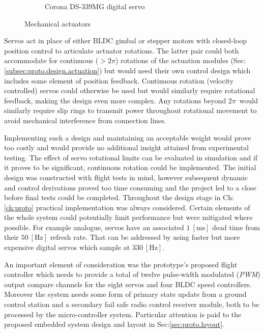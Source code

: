 \begin{figure}[hbtp]
\begin{subfigure}{0.5\textwidth}
\vspace{-6pt}
\caption{Corona DS-339MG digital servo~\cite{hobbyking}}
\label{fig:corona}
\end{subfigure}
\vspace{-8pt}
\caption{Mechanical actuators}
\vspace{-14pt}
\end{figure}
\par
Servos act in place of either BLDC gimbal or stepper motors with closed-loop position control to articulate actuator rotations. The latter pair could both accommodate for continuous ($>2\pi$) rotations of the actuation modules (Sec:\ref{subsec:proto.design.actuation}) but would need their own control design which includes some element of position feedback. Continuous rotation (velocity controlled) servos could otherwise be used but would similarly require rotational feedback, making the design even more complex. Any rotations beyond 2$\pi$~would similarly require slip rings to transmit power throughout rotational movement to avoid mechanical interference from connection lines. 
\par
Implementing such a design and maintaining an acceptable weight would prove too costly and would provide no additional insight attained from experimental testing. The effect of servo rotational limits can be evaluated in simulation and if it proves to be significant, continuous rotation could be implemented. The initial design was constructed with flight tests in mind, however subsequent dynamic and control derivations proved too time consuming and the project led to a close before final tests could be completed. Throughout the design stage in Ch:\ref{ch:proto} practical implementation was always considered. Certain elements of the whole system could potentially limit performance but were mitigated where possible. For example analogue, servos have an associated $1~[\text{ms}]$ dead time from their $50~[\text{Hz}]$ refresh rate. That can be addressed by using faster but more expensive digital servos which sample at $330~[\text{Hz}]$. 
\par
An important element of consideration was the prototype's proposed flight controller which needs to provide a total of twelve pulse-width modulated (\emph{PWM}) output compare channels for the eight servos and four BLDC speed controllers.  Moreover the system needs some form of primary state update from a ground control station and a secondary fail safe radio control receiver module, both to be processed by the micro-controller system. Particular attention is paid to the proposed embedded system design and layout in Sec:\ref{sec:proto.layout}.

